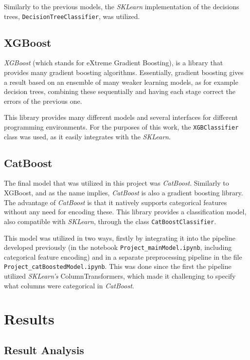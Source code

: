 \documentclass{IEEEtran}
\begin{document}
Similarly to the previous models, the \textit{SKLearn} implementation of the decisions trees, \texttt{DecisionTreeClassifier}, was utilized.

\subsection{XGBoost}

\textit{XGBoost} (which stands for eXtreme Gradient Boosting), is a library that provides many gradient boosting algorithms. Essentially, gradient boosting gives a result based on an ensemble of many weaker learning models, as for example decision trees, combining these sequentially and having each stage correct the errors of the previous one.

This library provides many different models and several interfaces for different programming environments. For the purposes of this work, the \texttt{XGBClassifier} class was used, as it easily integrates with the \textit{SKLearn}.

\subsection{CatBoost}

The final model that was utilized in this project was \textit{CatBoost}. Similarly to XGBoost, and as the name implies, \textit{CatBoost} is also a gradient boosting library. The advantage of \textit{CatBoost} is that it natively supports categorical features without any need for encoding these. This library provides a classification model, also compatible with \textit{SKLearn}, through the class \texttt{CatBoostClassifier}.

This model was utilized in two ways, firstly by integrating it into the pipeline developed previously (in the notebook \texttt{Project\_mainModel.ipynb}, including categorical feature encoding) and in a separate preprocessing pipeline in the file \texttt{Project\_catBoostedModel.ipynb}. This was done since the first the pipeline utilized \textit{SKLearn's} ColumnTransformers, which made it challenging to specify what columns were categorical in \textit{CatBoost}.

\section{Results}

\subsection{Result Analysis}
\end{document}

